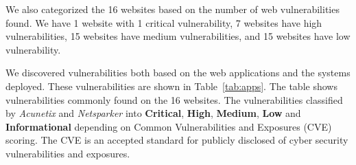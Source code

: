 \documentclass[conference]{IEEEtran}
\begin{document}

We also categorized the 16 websites based on the number of web vulnerabilities found. We have 1 website  with 1 critical vulnerability, 7 websites have high vulnerabilities, 15 websites have medium vulnerabilities, and 15 websites have low vulnerability. 





We discovered vulnerabilities both based on the web
applications and the systems deployed. These vulnerabilities are shown in Table~\ref{tab:apps}. The table shows vulnerabilities commonly
found on the 16 websites. The vulnerabilities classified by \emph{Acunetix} and \emph{Netsparker} into
\textbf{Critical}, \textbf{High}, \textbf{Medium}, \textbf{Low} and 
\textbf{Informational} depending on Common
Vulnerabilities and Exposures (CVE) scoring. The CVE is an accepted
standard for publicly disclosed of cyber security vulnerabilities and exposures\cite{makino2015evaluation}.

\renewcommand{\arraystretch}{1.3}
\end{document}
